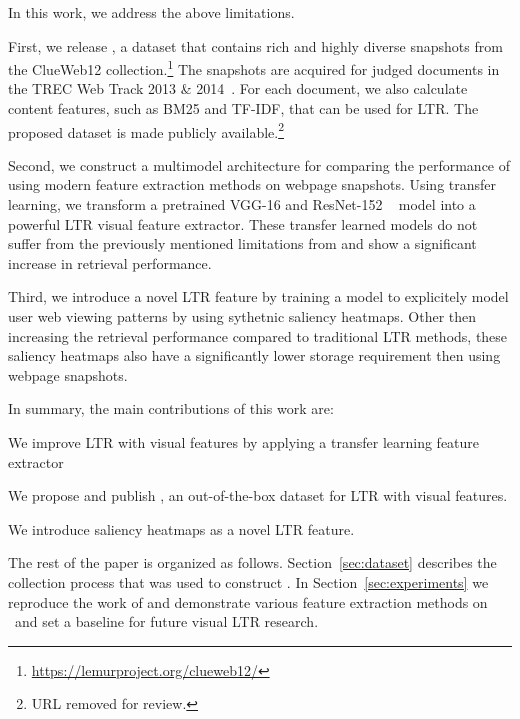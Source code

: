 In this work, we address the above limitations.

First, we release \datasetname, a dataset that contains rich and highly diverse snapshots from the ClueWeb12 collection.\footnote{\url{https://lemurproject.org/clueweb12/}} The snapshots are acquired for judged documents in the TREC Web Track 2013 \& 2014~\cite{collins2013trec,collins2015trec}. For each document, we also calculate content features, such as BM25 and TF-IDF, that can be used for \ac{LTR}.
The proposed dataset is made publicly available.\footnote{URL removed for review.}

Second, we construct a multimodel architecture for comparing the performance of using modern feature extraction methods on webpage snapshots. Using transfer learning, we transform a pretrained VGG-16 and ResNet-152 ~\cite{simonyan2014very, he2016deep} model into a powerful \ac{LTR} visual feature extractor. These transfer learned models do not suffer from the previously mentioned limitations from \cite{fan2017learning} and show a significant increase in retrieval performance.



%
Third, we introduce a novel \ac{LTR} feature by training a model to explicitely model user web viewing patterns by using sythetnic saliency heatmaps. Other then increasing the retrieval performance compared to traditional \ac{LTR} methods, these saliency heatmaps also have a significantly lower storage requirement then using webpage snapshots.

In summary, the main contributions of this work are:
\begin{inparaenum}[(i)]
\item We improve \ac{LTR} with visual features by applying a transfer learning feature extractor 
\item We propose and publish \datasetname, an out-of-the-box dataset for \ac{LTR} with visual features.
\item We introduce saliency heatmaps as a novel \ac{LTR} feature. 
\end{inparaenum}

 The rest of the paper is organized as follows. Section~\ref{sec:dataset} describes the collection process that was used to construct \datasetname. In Section~\ref{sec:experiments} we reproduce the work of \citet{fan2017learning} and demonstrate various feature extraction methods on \datasetname~and set a baseline for future visual \ac{LTR} research.  
\fi